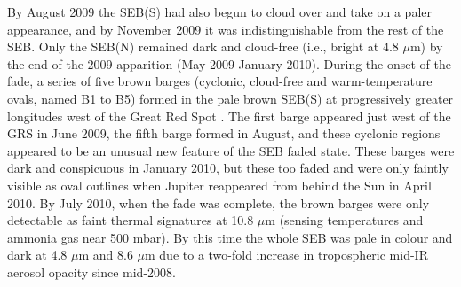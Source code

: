 \documentclass[final,authoryear,5p,times,twocolumn]{elsarticle}
\begin{document}
By August 2009 the SEB(S) had also begun to cloud over and take on a paler appearance, and by November 2009 it was indistinguishable from the rest of the SEB.  Only the SEB(N) remained dark and cloud-free (i.e., bright at 4.8 $\mu$m) by the end of the 2009 apparition (May 2009-January 2010).  During the onset of the fade, a series of five brown barges (cyclonic, cloud-free and warm-temperature ovals, named B1 to B5) formed in the pale brown SEB(S) at progressively greater longitudes west of the Great Red Spot \citep{11rogers_21, 11fletcher_fade, 12perezhoyos}.    The first barge appeared just west of the GRS in June 2009, the fifth barge formed in August, and these cyclonic regions appeared to be an unusual new feature of the SEB faded state.  These barges were dark and conspicuous in January 2010, but these too faded and were only faintly visible as oval outlines when Jupiter reappeared from behind the Sun in April 2010.  By July 2010, when the fade was complete, the brown barges were only detectable as faint thermal signatures at 10.8 $\mu$m (sensing temperatures and ammonia gas near 500 mbar).  By this time the whole SEB was pale in colour and dark at 4.8 $\mu$m and 8.6 $\mu$m due to a two-fold increase in tropospheric mid-IR aerosol opacity since mid-2008. 
\end{document}
